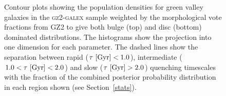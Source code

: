 \begin{figure}
\caption[Population densities of green smooth and disc galaxies]{Contour plots showing the population densities for green valley galaxies in the \textsc{gz2-galex} sample weighted by the morphological vote fractions from GZ2 to give both bulge (top) and disc (bottom) dominated distributions. The histograms show the projection into one dimension for each parameter. The dashed lines show the separation between rapid ($\tau ~\rm{[Gyr]} < 1.0$), intermediate ($1.0 < \tau ~\rm{[Gyr]} < 2.0$) and slow ($\tau ~\rm{[Gyr]} > 2.0$) quenching timescales with the fraction of the combined posterior probability distribution in each region shown (see Section~\ref{stats}).}
\label{green_v}
\end{figure}

